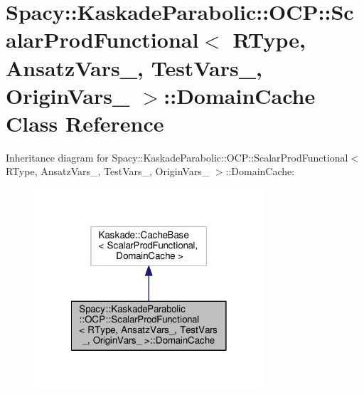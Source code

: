 \hypertarget{classSpacy_1_1KaskadeParabolic_1_1OCP_1_1ScalarProdFunctional_1_1DomainCache}{\section{Spacy\-:\-:Kaskade\-Parabolic\-:\-:O\-C\-P\-:\-:Scalar\-Prod\-Functional$<$ R\-Type, Ansatz\-Vars\-\_\-, Test\-Vars\-\_\-, Origin\-Vars\-\_\- $>$\-:\-:Domain\-Cache Class Reference}
\label{classSpacy_1_1KaskadeParabolic_1_1OCP_1_1ScalarProdFunctional_1_1DomainCache}
}


Inheritance diagram for Spacy\-:\-:Kaskade\-Parabolic\-:\-:O\-C\-P\-:\-:Scalar\-Prod\-Functional$<$ R\-Type, Ansatz\-Vars\-\_\-, Test\-Vars\-\_\-, Origin\-Vars\-\_\- $>$\-:\-:Domain\-Cache\-:
\nopagebreak
\begin{figure}[H]
\begin{center}
\leavevmode
\includegraphics[width=242pt]{classSpacy_1_1KaskadeParabolic_1_1OCP_1_1ScalarProdFunctional_1_1DomainCache__inherit__graph}
\end{center}
\end{figure}


